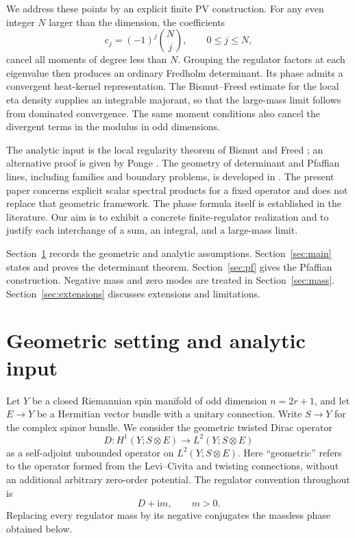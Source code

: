 \documentclass[11pt,a4paper]{article}
\theoremstyle{remark}
\newcommand{\ii}{\mathrm i}
\numberwithin{equation}{section}
\begin{document}
We address these points by an explicit finite PV construction. For any
even integer $N$ larger than the dimension, the coefficients
\begin{equation}\label{eq:intro-c}
 c_j=(-1)^j\binom Nj,\qquad 0\le j\le N,
\end{equation}
cancel all moments of degree less than $N$. Grouping the regulator
factors at each eigenvalue then produces an ordinary Fredholm
determinant. Its phase admits a convergent heat-kernel representation.
The Bismut--Freed estimate for the local eta density supplies an
integrable majorant, so that the large-mass limit follows from dominated
convergence. The same moment conditions also cancel the divergent
terms in the modulus in odd dimensions.

The analytic input is the local regularity theorem of Bismut and
Freed \cite{BF}; an alternative proof is given by Ponge \cite{Ponge}.
The geometry of determinant and Pfaffian lines, including families and
boundary problems, is developed in \cite{DF,FM}. The present paper
concerns explicit scalar spectral products for a fixed operator and
does not replace that geometric framework. The phase formula itself
is established in the literature. Our aim is to exhibit a concrete
finite-regulator realization and to justify each interchange of a sum,
an integral, and a large-mass limit.

Section~\ref{sec:setup} records the geometric and analytic assumptions.
Section~\ref{sec:main} states and proves the determinant theorem.
Section~\ref{sec:pf} gives the Pfaffian construction.
Negative mass and zero modes are treated in Section~\ref{sec:mass}.
Section~\ref{sec:extensions} discusses extensions and limitations.

\section{Geometric setting and analytic input}\label{sec:setup}

Let $Y$ be a closed Riemannian spin manifold of odd dimension
$n=2r+1$, and let $E\to Y$ be a Hermitian vector bundle with a unitary
connection. Write $S\to Y$ for the complex spinor bundle. We consider
the geometric twisted Dirac operator
\[
 D:H^1(Y;S\otimes E)\longrightarrow L^2(Y;S\otimes E)
\]
as a self-adjoint unbounded operator on $L^2(Y;S\otimes E)$.
Here ``geometric'' refers to the operator formed from the Levi--Civita
and twisting connections, without an additional arbitrary zero-order
potential. The regulator convention throughout is
\begin{equation}\label{eq:mass-sign}
 D+\ii m,\qquad m>0.
\end{equation}
Replacing every regulator mass by its negative conjugates the
massless phase obtained below.
\end{document}
